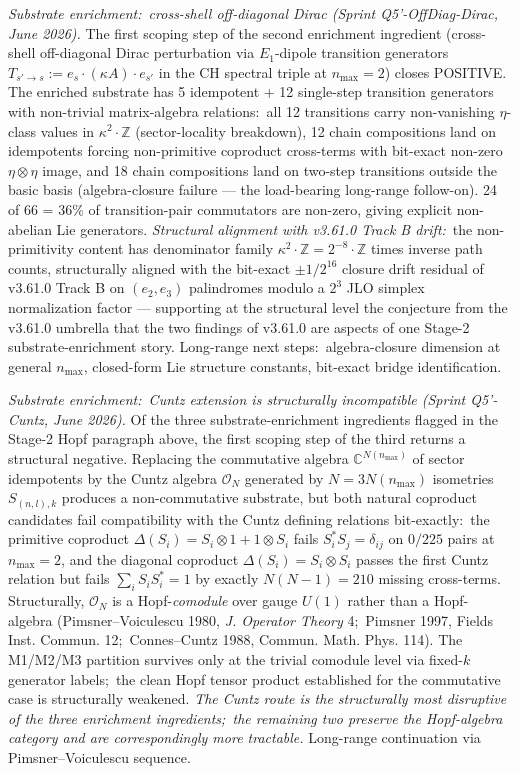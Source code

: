 \documentclass[11pt,a4paper]{article}
\theoremstyle{plain}
\theoremstyle{definition}
\begin{document}
\emph{Substrate enrichment:\ cross-shell off-diagonal Dirac (Sprint
Q5'-OffDiag-Dirac, June 2026).}  The first
scoping step of the second enrichment ingredient (cross-shell
off-diagonal Dirac perturbation via $E_1$-dipole transition
generators $T_{s' \to s} := e_s \cdot (\kappa A) \cdot e_{s'}$ in the
CH spectral triple at $n_{\max} = 2$) closes POSITIVE.  The enriched
substrate has 5 idempotent + 12 single-step transition generators
with non-trivial matrix-algebra relations:\ all 12 transitions carry
non-vanishing $\eta$-class values in $\kappa^2 \cdot \mathbb{Z}$
(sector-locality breakdown), 12 chain compositions land on idempotents
forcing non-primitive coproduct cross-terms with bit-exact non-zero
$\eta \otimes \eta$ image, and 18 chain compositions land on two-step
transitions outside the basic basis (algebra-closure failure --- the
load-bearing long-range follow-on).  24 of 66 = 36\% of transition-pair
commutators are non-zero, giving explicit non-abelian Lie generators.
\emph{Structural alignment with v3.61.0 Track B drift:}\ the
non-primitivity content has denominator family
$\kappa^2 \cdot \mathbb{Z} = 2^{-8} \cdot \mathbb{Z}$ times inverse
path counts, structurally aligned with the bit-exact $\pm 1/2^{16}$
closure drift residual of v3.61.0 Track B on $(e_2, e_3)$ palindromes
modulo a $2^3$ JLO simplex normalization factor --- supporting at the
structural level the conjecture from the v3.61.0 umbrella that the two
findings of v3.61.0 are aspects of one Stage-2 substrate-enrichment
story.  Long-range next steps:\ algebra-closure dimension at general
$n_{\max}$, closed-form Lie structure constants, bit-exact bridge
identification.

\emph{Substrate enrichment:\ Cuntz extension is structurally
incompatible (Sprint Q5'-Cuntz, June 2026).}  Of the three
substrate-enrichment ingredients flagged in the Stage-2 Hopf paragraph
above, the first scoping step of the third returns a structural
negative.  Replacing the commutative algebra $\mathbb{C}^{N(n_{\max})}$
of sector idempotents by the Cuntz algebra $\mathcal{O}_N$ generated
by $N = 3 N(n_{\max})$ isometries $S_{(n, l), k}$ produces a
non-commutative substrate, but both natural coproduct candidates fail
compatibility with the Cuntz defining relations bit-exactly:\ the
primitive coproduct $\Delta(S_i) = S_i \otimes 1 + 1 \otimes S_i$
fails $S_i^* S_j = \delta_{ij}$ on $0/225$ pairs at $n_{\max} = 2$,
and the diagonal coproduct $\Delta(S_i) = S_i \otimes S_i$ passes the
first Cuntz relation but fails $\sum_i S_i S_i^* = 1$ by exactly
$N(N - 1) = 210$ missing cross-terms.  Structurally, $\mathcal{O}_N$
is a Hopf-\emph{comodule} over gauge $U(1)$ rather than a
Hopf-algebra (Pimsner--Voiculescu 1980, \emph{J. Operator Theory} 4;\
Pimsner 1997, Fields Inst. Commun. 12;\ Connes--Cuntz 1988,
Commun. Math. Phys. 114).  The M1/M2/M3 partition survives only at
the trivial comodule level via fixed-$k$ generator labels;\ the clean
Hopf tensor product established for the commutative case is
structurally weakened.  \emph{The Cuntz route is the structurally
most disruptive of the three enrichment ingredients;\ the remaining
two preserve the Hopf-algebra category and are correspondingly more
tractable.}  Long-range continuation via Pimsner--Voiculescu sequence.
\end{document}
